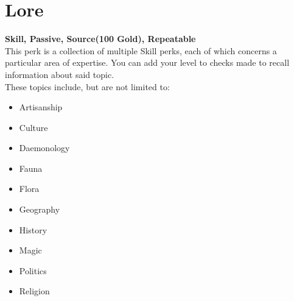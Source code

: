 \section{Lore}\label{sec:lore}
\textbf{Skill, Passive, Source(100 Gold), Repeatable}\\
This perk is a collection of multiple Skill perks, each of which concerns a particular area of expertise.
You can add your level to checks made to recall information about said topic.\\
These topics include, but are not limited to:\\

\begin{itemize}
\item Artisanship
\item Culture
\item Daemonology
\item Fauna
\item Flora
\item Geography
\item History
\item Magic
\item Politics
\item Religion
\end{itemize}